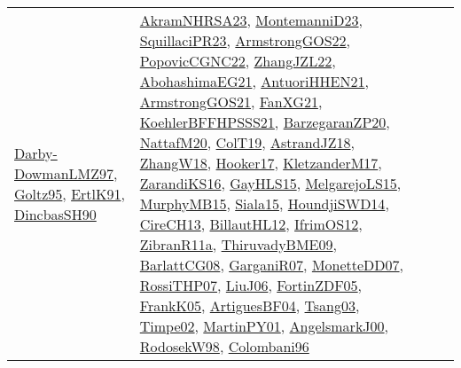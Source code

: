 {\begin{longtable}{lp{3cm}>{\raggedright}p{6cm}>{\raggedright}p{6cm}p{8cm}}
\href{articles/Darby-DowmanLMZ97.pdf}{Darby-DowmanLMZ97}\cite{Darby-DowmanLMZ97}, \href{papers/Goltz95.pdf}{Goltz95}\cite{Goltz95}, \href{papers/ErtlK91.pdf}{ErtlK91}\cite{ErtlK91}, \href{articles/DincbasSH90.pdf}{DincbasSH90}\cite{DincbasSH90} & \href{articles/AkramNHRSA23.pdf}{AkramNHRSA23}\cite{AkramNHRSA23}, \href{articles/MontemanniD23.pdf}{MontemanniD23}\cite{MontemanniD23}, \href{papers/SquillaciPR23.pdf}{SquillaciPR23}\cite{SquillaciPR23}, \href{papers/ArmstrongGOS22.pdf}{ArmstrongGOS22}\cite{ArmstrongGOS22}, \href{papers/PopovicCGNC22.pdf}{PopovicCGNC22}\cite{PopovicCGNC22}, \href{papers/ZhangJZL22.pdf}{ZhangJZL22}\cite{ZhangJZL22}, \href{articles/AbohashimaEG21.pdf}{AbohashimaEG21}\cite{AbohashimaEG21}, \href{papers/AntuoriHHEN21.pdf}{AntuoriHHEN21}\cite{AntuoriHHEN21}, \href{papers/ArmstrongGOS21.pdf}{ArmstrongGOS21}\cite{ArmstrongGOS21}, \href{articles/FanXG21.pdf}{FanXG21}\cite{FanXG21}, \href{articles/KoehlerBFFHPSSS21.pdf}{KoehlerBFFHPSSS21}\cite{KoehlerBFFHPSSS21}, \href{papers/BarzegaranZP20.pdf}{BarzegaranZP20}\cite{BarzegaranZP20}, \href{papers/NattafM20.pdf}{NattafM20}\cite{NattafM20}, \href{papers/ColT19.pdf}{ColT19}\cite{ColT19}, \href{papers/AstrandJZ18.pdf}{AstrandJZ18}\cite{AstrandJZ18}, \href{articles/ZhangW18.pdf}{ZhangW18}\cite{ZhangW18}, \href{papers/Hooker17.pdf}{Hooker17}\cite{Hooker17}, \href{papers/KletzanderM17.pdf}{KletzanderM17}\cite{KletzanderM17}, \href{articles/ZarandiKS16.pdf}{ZarandiKS16}\cite{ZarandiKS16}, \href{papers/GayHLS15.pdf}{GayHLS15}\cite{GayHLS15}, \href{papers/MelgarejoLS15.pdf}{MelgarejoLS15}\cite{MelgarejoLS15}, \href{papers/MurphyMB15.pdf}{MurphyMB15}\cite{MurphyMB15}, \href{articles/Siala15.pdf}{Siala15}\cite{Siala15}, \href{papers/HoundjiSWD14.pdf}{HoundjiSWD14}\cite{HoundjiSWD14}, \href{papers/CireCH13.pdf}{CireCH13}\cite{CireCH13}, \href{papers/BillautHL12.pdf}{BillautHL12}\cite{BillautHL12}, \href{papers/IfrimOS12.pdf}{IfrimOS12}\cite{IfrimOS12}, \href{papers/ZibranR11a.pdf}{ZibranR11a}\cite{ZibranR11a}, \href{papers/ThiruvadyBME09.pdf}{ThiruvadyBME09}\cite{ThiruvadyBME09}, \href{papers/BarlattCG08.pdf}{BarlattCG08}\cite{BarlattCG08}, \href{papers/GarganiR07.pdf}{GarganiR07}\cite{GarganiR07}, \href{papers/MonetteDD07.pdf}{MonetteDD07}\cite{MonetteDD07}, \href{papers/RossiTHP07.pdf}{RossiTHP07}\cite{RossiTHP07}, \href{papers/LiuJ06.pdf}{LiuJ06}\cite{LiuJ06}, \href{papers/FortinZDF05.pdf}{FortinZDF05}\cite{FortinZDF05}, \href{papers/FrankK05.pdf}{FrankK05}\cite{FrankK05}, \href{papers/ArtiguesBF04.pdf}{ArtiguesBF04}\cite{ArtiguesBF04}, \href{articles/Tsang03.pdf}{Tsang03}\cite{Tsang03}, \href{articles/Timpe02.pdf}{Timpe02}\cite{Timpe02}, \href{articles/MartinPY01.pdf}{MartinPY01}\cite{MartinPY01}, \href{papers/AngelsmarkJ00.pdf}{AngelsmarkJ00}\cite{AngelsmarkJ00}, \href{papers/RodosekW98.pdf}{RodosekW98}\cite{RodosekW98}, \href{papers/Colombani96.pdf}{Colombani96}\cite{Colombani96}\\

\end{longtable}}
